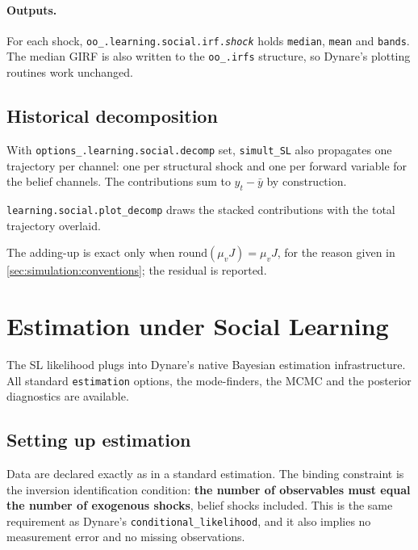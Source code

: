 \documentclass[11pt,a4paper]{article}
\newcommand{\command}[1]{\texttt{#1}}
\newcommand{\option}[1]{\texttt{#1}}
\newcommand{\field}[1]{\texttt{#1}}
\begin{document}
\paragraph{Outputs.} For each shock,
\field{oo\_.learning.social.irf.\textit{shock}} holds \field{median},
\field{mean} and \field{bands}. The median GIRF is also written to the
\field{oo\_.irfs} structure, so Dynare's plotting routines work unchanged.


\subsection{Historical decomposition}
\label{sec:simulation:decomp}

With \field{options\_.learning.social.decomp} set, \texttt{simult\_SL} also
propagates one trajectory per channel: one per structural shock and one per
forward variable for the belief channels. The contributions sum to
$y_t - \bar{y}$ by construction.

\texttt{learning.social.plot\_decomp} draws the stacked contributions with the
total trajectory overlaid.

\medskip
\noindent
The adding-up is exact only when $\mathrm{round}(\mu_v J) = \mu_v J$, for the
reason given in \cref{sec:simulation:conventions}; the residual is reported.


\section{Estimation under Social Learning}
\label{sec:estimation}

The SL likelihood plugs into Dynare's native Bayesian estimation
infrastructure. All standard \command{estimation} options, the mode-finders,
the MCMC and the posterior diagnostics are available.


\subsection{Setting up estimation}
\label{sec:estimation:setup}

Data are declared exactly as in a standard estimation. The binding constraint
is the inversion identification condition: \textbf{the number of observables
must equal the number of exogenous shocks}, belief shocks included. This is the
same requirement as Dynare's \option{conditional\_likelihood}, and it also
implies no measurement error and no missing observations.
\end{document}

